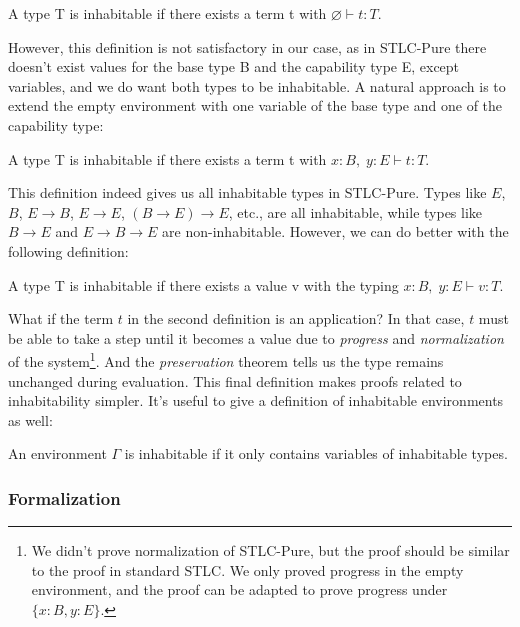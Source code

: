 \begin{definition}
  A type T is inhabitable if there exists a term t with $\varnothing
  \vdash t : T$.
\end{definition}

However, this definition is not satisfactory in our case, as in
STLC-Pure there doesn't exist values for the base type B and the
capability type E, except variables, and we do want both types to be
inhabitable. A natural approach is to extend the empty environment
with one variable of the base type and one of the capability type:

\begin{definition}
  A type T is inhabitable if there exists a term t with
  $x:B,\; y:E \vdash t : T$.
\end{definition}

This definition indeed gives us all inhabitable types in
STLC-Pure. Types like $E$, $B$, $E \to B$, $E \to E$,
$(B \to E) \to E$, etc., are all inhabitable, while types like
$B \to E$ and $E \to B \to E$ are non-inhabitable. However, we can do
better with the following definition:

\begin{definition}
  A type T is inhabitable if there exists a value v with the typing
  $x:B,\; y:E \vdash v : T$.
\end{definition}

What if the term $t$ in the second definition is an application? In
that case, $t$ must be able to take a step until it becomes a value
due to \emph{progress} and \emph{normalization} of the
system\footnote{We didn't prove normalization of STLC-Pure, but the
  proof should be similar to the proof in standard STLC. We only
  proved progress in the empty environment, and the proof can be
  adapted to prove progress under $\{x:B, y:E\}$.}. And the
\emph{preservation} theorem tells us the type remains unchanged during
evaluation. This final definition makes proofs related to
inhabitability simpler. It's useful to give a definition of
inhabitable environments as well:

\begin{definition}
  An environment $\Gamma$ is inhabitable if it only contains variables
  of inhabitable types.
\end{definition}

\subsubsection{Formalization}

